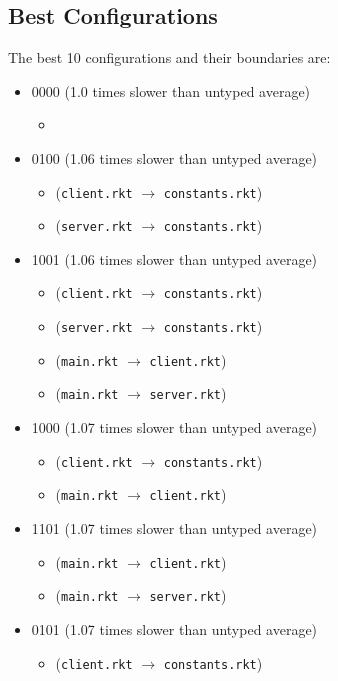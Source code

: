 \documentclass{article}
\newcommand{\mono}[1]{\texttt{#1}}
\begin{document}
\subsection{Best Configurations}
The best 10 configurations and their boundaries are:
\begin{itemize}
\item 0000 (1.0 times slower than untyped average)
  \begin{itemize}
  \item 
  \end{itemize}
\item 0100 (1.06 times slower than untyped average)
  \begin{itemize}
  \item (\mono{client.rkt} $\rightarrow$ \mono{constants.rkt})
  \item (\mono{server.rkt} $\rightarrow$ \mono{constants.rkt})
  \end{itemize}
\item 1001 (1.06 times slower than untyped average)
  \begin{itemize}
  \item (\mono{client.rkt} $\rightarrow$ \mono{constants.rkt})
  \item (\mono{server.rkt} $\rightarrow$ \mono{constants.rkt})
  \item (\mono{main.rkt} $\rightarrow$ \mono{client.rkt})
  \item (\mono{main.rkt} $\rightarrow$ \mono{server.rkt})
  \end{itemize}
\item 1000 (1.07 times slower than untyped average)
  \begin{itemize}
  \item (\mono{client.rkt} $\rightarrow$ \mono{constants.rkt})
  \item (\mono{main.rkt} $\rightarrow$ \mono{client.rkt})
  \end{itemize}
\item 1101 (1.07 times slower than untyped average)
  \begin{itemize}
  \item (\mono{main.rkt} $\rightarrow$ \mono{client.rkt})
  \item (\mono{main.rkt} $\rightarrow$ \mono{server.rkt})
  \end{itemize}
\item 0101 (1.07 times slower than untyped average)
  \begin{itemize}
  \item (\mono{client.rkt} $\rightarrow$ \mono{constants.rkt})

\end{itemize}
\end{itemize}
\end{document}
